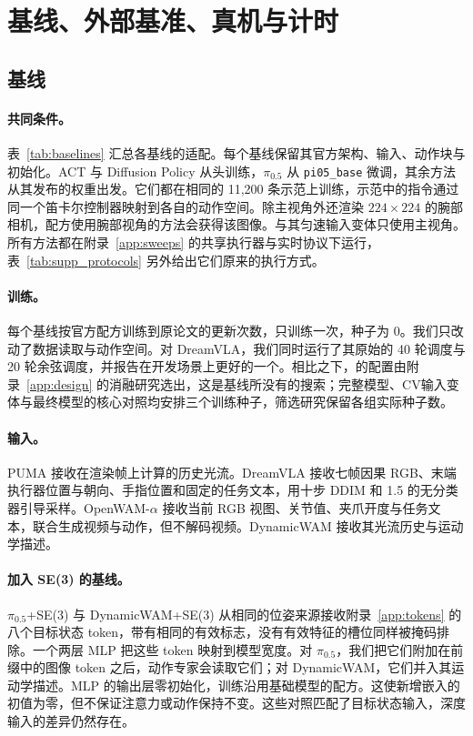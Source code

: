 \section{基线、外部基准、真机与计时}
\label{app:evaluation}

\subsection{基线}
\label{app:baselines}
\paragraph{共同条件。}表~\ref{tab:baselines} 汇总各基线的适配。每个基线保留其官方架构、输入、动作块与初始化。ACT 与 Diffusion Policy 从头训练，$\pi_{0.5}$ 从 \texttt{pi05\_base} 微调，其余方法从其发布的权重出发。它们都在相同的 11{,}200 条示范上训练，示范中的指令通过同一个笛卡尔控制器映射到各自的动作空间。\bench 除主视角外还渲染 $224\times224$ 的腕部相机，配方使用腕部视角的方法会获得该图像。\ours 与其匀速输入变体只使用主视角。所有方法都在附录~\ref{app:sweeps} 的共享执行器与实时协议下运行，表~\ref{tab:supp_protocols} 另外给出它们原来的执行方式。

\paragraph{训练。}每个基线按官方配方训练到原论文的更新次数，只训练一次，种子为 0。我们只改动了数据读取与动作空间。对 DreamVLA，我们同时运行了其原始的 40 轮调度与 20 轮余弦调度，并报告在开发场景上更好的一个。相比之下，\ours 的配置由附录~\ref{app:design} 的消融研究选出，这是基线所没有的搜索；完整模型、CV输入变体与最终模型的核心对照均安排三个训练种子，筛选研究保留各组实际种子数。

\paragraph{输入。}PUMA \cite{domino} 接收在渲染帧上计算的历史光流。DreamVLA 接收七帧因果 RGB、末端执行器位置与朝向、手指位置和固定的任务文本，用十步 DDIM 和 1.5 的无分类器引导采样。OpenWAM-$\alpha$ 接收当前 RGB 视图、关节值、夹爪开度与任务文本，联合生成视频与动作，但不解码视频。DynamicWAM 接收其光流历史与运动学描述。

\paragraph{加入 SE(3) 的基线。}$\pi_{0.5}$+SE(3) 与 DynamicWAM+SE(3) 从相同的位姿来源接收附录~\ref{app:tokens} 的八个目标状态 token，带有相同的有效标志，没有有效特征的槽位同样被掩码排除。一个两层 MLP 把这些 token 映射到模型宽度。对 $\pi_{0.5}$，我们把它们附加在前缀中的图像 token 之后，动作专家会读取它们；对 DynamicWAM，它们并入其运动学描述。MLP 的输出层零初始化，训练沿用基础模型的配方。这使新增嵌入的初值为零，但不保证注意力或动作保持不变。这些对照匹配了目标状态输入，深度输入的差异仍然存在。

